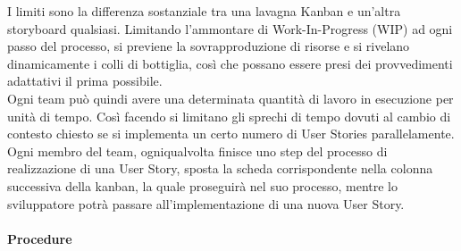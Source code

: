 I limiti sono la differenza sostanziale tra una lavagna Kanban e un’altra storyboard qualsiasi. Limitando l’ammontare di Work-In-Progress (WIP) ad ogni passo del processo, si previene la sovrapproduzione di risorse e si rivelano dinamicamente i colli di bottiglia, così che possano essere presi dei provvedimenti adattativi il prima possibile.\\
Ogni team può quindi avere una determinata quantità di lavoro in esecuzione per unità di tempo. Così facendo si limitano gli sprechi di tempo dovuti al cambio di contesto chiesto se si implementa un certo numero di User Stories parallelamente. Ogni membro del team, ogniqualvolta finisce uno step del processo di realizzazione di una User Story, sposta la scheda corrispondente nella colonna successiva della kanban, la quale proseguirà nel suo processo, mentre lo sviluppatore potrà passare all’implementazione di una nuova User Story.

\paragraph{Procedure}




